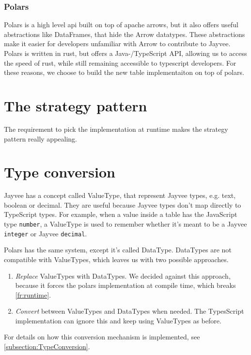 \subsubsection{Polars}
\label{subsection:polars}
Polars is a high level api built on top of apache arrows, but it also offers useful abstractions like DataFrames, that hide the Arrow datatypes.
These abstractions make it easier for developers unfamiliar with Arrow to contribute to Jayvee.
Polars is written in rust, but offers a Java-/TypeScript \ac{API}, allowing us %
to access the speed of rust, %
while still remaining accessible to typescript developers.
For these reasons, we choose to build the new table implementaiton on top of polars.


\section{The strategy pattern}
The requirement to pick the implementation at runtime makes the strategy pattern really appealing. %

\section{Type conversion}
\label{section:type_conversion}
Jayvee has a concept called ValueType, that represent Jayvee types, e.g. text, boolean or decimal.
They are useful because Jayvee types don't map directly to TypeScript types.
For example, when a value inside a table has the JavaScript type \Verb|number|, a ValueType is used to remember whether it's meant to be a Jayvee \Verb|integer| or Jayvee \Verb|decimal|.

Polars has the same system, except it's called DataType.
DataTypes are not compatible with ValueTypes, which leaves us with two possible approaches.
\begin{enumerate}
	\item \emph{Replace} ValueTypes with DataTypes.
	      We decided against this approach, because it forces the polars implementation at compile time, which breaks \ref{fr:runtime}.
	\item \emph{Convert} between ValueTypes and DataTypes when needed.
	      The TypesScript implementation can ignore this and keep using ValueTypes as before.
\end{enumerate}

For details on how this conversion mechanism is implemented, see \ref{subsection:TypeConversion}.

